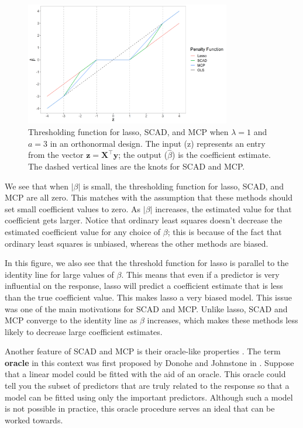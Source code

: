 \documentclass{article}
\begin{document}
\begin{figure}[!h]
	\centering
	\includegraphics[width = 0.8\textwidth]{images/lasso-scad-mcp-solution.png}
	\captionsetup{width = 0.8\textwidth}
	\caption{Thresholding function for lasso, SCAD, and MCP when $\lambda = 1$ and $a = 3$ in an orthonormal design. The input (z) represents an entry from the vector $\mathbf{z}=\mathbf{X}^\top \mathbf{y}$; the output ($\hat{\beta}$) is the coefficient estimate. The dashed vertical lines are the knots for SCAD and MCP.}
	\label{fig:prediction}
\end{figure}

We see that when $\vert \beta \vert$ is small, the thresholding function for lasso, SCAD, and MCP are all zero. This matches with the assumption that these methods should set small coefficient values to zero. As $\vert \beta \vert$ increases, the estimated value for that coefficient gets larger. Notice that ordinary least squares doesn't decrease the estimated coefficient value for any choice of $\beta$; this is because of the fact that ordinary least squares is unbiased, whereas the other methods are biased.

In this figure, we also see that the threshold function for lasso is parallel to the identity line for large values of $\beta$. This means that even if a predictor is very influential on the response, lasso will predict a coefficient estimate that is less than the true coefficient value. This makes lasso a very biased model. This issue was one of the main motivations for SCAD and MCP. Unlike lasso, SCAD and MCP converge to the identity line as $\beta$ increases, which makes these methods less likely to decrease large coefficient estimates.

Another feature of SCAD and MCP is their oracle-like properties \cite{fan2001variable, zhang2010nearly}. The term \textbf{oracle} in this context was first proposed by Donohe and Johnstone in \cite{donoho1994ideal}. Suppose that a linear model could be fitted with the aid of an oracle. This oracle could tell you the subset of predictors that are truly related to the response so that a model can be fitted using only the important predictors. Although such a model is not possible in practice, this oracle procedure serves an ideal that can be worked towards.
\end{document}
